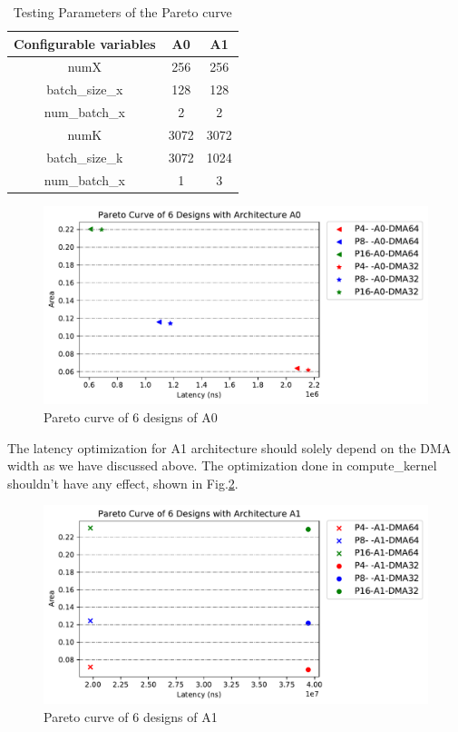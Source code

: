 \begin{table}[h!]
     \centering
     \begin{tabular}{c|c|c}
        \hline
          Configurable variables& A0 & A1  \\
         \hline
         numX & 256 & 256 \\
         \hline
         batch\_size\_x & 128 & 128 \\
         \hline
         num\_batch\_x & 2 & 2 \\
          \hline
         numK & 3072 & 3072 \\  
         \hline
         batch\_size\_k & 3072 & 1024 \\
         \hline
         num\_batch\_x & 1 & 3 \\
         \hline
     \end{tabular}
     \caption{Testing Parameters of the Pareto curve}
     \label{tab-test-param}
 \end{table}

\begin{figure}[h!]
    \centering
    \includegraphics[width=\columnwidth]{figures/Pareto-curve-A0}
    \caption{Pareto curve of 6 designs of A0}
    \label{fig-paral}
\end{figure}

The latency optimization for A1 architecture should solely depend on the DMA
width as we have discussed above. The optimization done in compute\_kernel
shouldn't have any effect, shown in Fig.\ref{fig-a1-pareto}.\\

\begin{figure}[h!]
    \centering
    \includegraphics[width=\columnwidth]{figures/Pareto-curve-A1}
    \caption{Pareto curve of 6 designs of A1}
    \label{fig-a1-pareto}
\end{figure}



